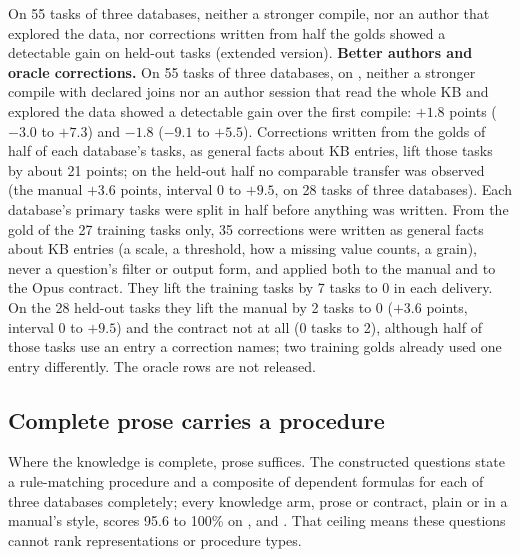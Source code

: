 \ifextended\else
On 55 tasks of three databases, neither a stronger compile, nor an author
that explored the data, nor corrections written from half the golds
showed a detectable gain on held-out tasks (extended version).
\fi
\ifextended
\textbf{Better authors and oracle corrections.} On 55 tasks of three
databases, on \mLuna{}, neither a stronger compile with declared joins nor
an author session that read the whole KB and explored the data showed a
detectable gain over the first compile: $+1.8$ points ($-3.0$ to $+7.3$)
and $-1.8$ ($-9.1$ to $+5.5$). Corrections written from the golds of half
of each database's tasks, as general facts about KB entries, lift those
tasks by about 21 points; on the held-out half no comparable transfer was
observed (the manual $+3.6$ points, interval 0 to $+9.5$, on 28 tasks of
three databases).
Each database's primary tasks were split in half before anything was
written. From the gold of the 27 training tasks only, 35 corrections were
written as general facts about KB entries (a scale, a threshold, how a
missing value counts, a grain), never a question's filter or output form,
and applied both to the manual and to the Opus contract. They lift the
training tasks by 7 tasks to 0 in each delivery. On the 28 held-out tasks
they lift the manual by 2 tasks to 0 ($+3.6$ points, interval 0 to
$+9.5$) and the contract not at all (0 tasks to 2), although half of those
tasks use an entry a correction names; two training golds already used one
entry differently. The oracle rows are not released.
\fi

\subsection{Complete prose carries a procedure}
\label{sec:procedures}
\label{sec:account}

Where the knowledge is complete, prose suffices. The constructed questions
state a rule-matching procedure and a composite of dependent formulas for
each of three databases completely; every knowledge arm, prose or contract,
plain or in a manual's style, scores 95.6 to 100\% on \mLuna{}, \mSol{} and
\mQwen{}. That ceiling means these questions cannot rank representations or
procedure types.
